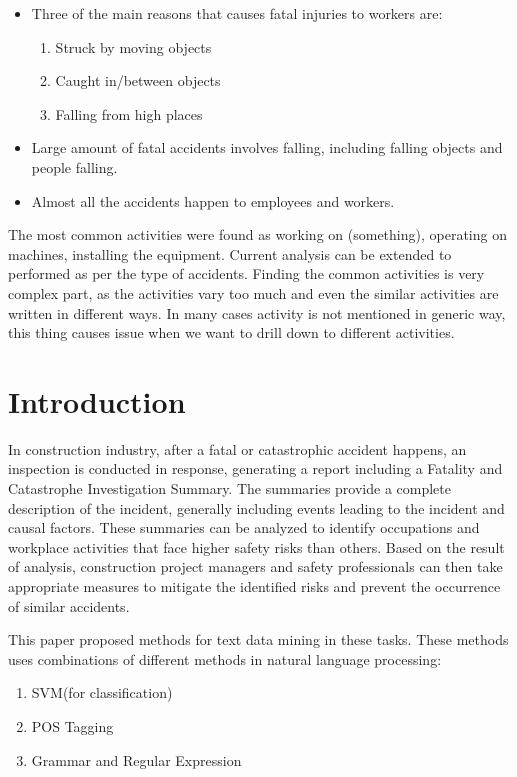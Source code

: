 \documentclass[DIV=calc, paper=a4, fontsize=11pt, twocolumn]{scrartcl}	 %
\begin{document}
\begin{itemize}
\item Three of the main reasons that causes fatal injuries to workers
  are:
  \begin{enumerate}
  \item Struck by moving objects
 \item Caught in/between objects
\item Falling from high places
  \end{enumerate}

\item Large amount of fatal accidents involves falling, including
  falling objects and people falling.

\item Almost all the accidents happen to employees and workers.

\end{itemize}

The most common activities were found as working on (something), operating on machines,
installing the equipment.
Current analysis can be extended to performed as per the type of accidents.
Finding the common activities is very complex part, as the activities vary too much and even the
similar activities are written in different ways.
In many cases activity is not mentioned in generic way, this thing causes issue when we want to
drill down to different activities.
\section*{Introduction}
In construction industry, after a fatal or catastrophic accident
happens, an inspection is conducted in response, generating a report
including a Fatality and Catastrophe Investigation Summary. The
summaries provide a complete description of the incident, generally
including events leading to the incident and causal factors. These
summaries can be analyzed to identify occupations and workplace
activities that face higher safety risks than others. Based on the
result of analysis, construction project managers and safety
professionals can then take appropriate measures to mitigate the
identified risks and prevent the occurrence of similar accidents.

This paper proposed methods for text data mining in these tasks. These
methods uses combinations of different methods in natural language
processing:

\begin{enumerate}
\item SVM(for classification)
\item POS Tagging
\item Grammar and Regular Expression
\end{enumerate}
\end{document}
